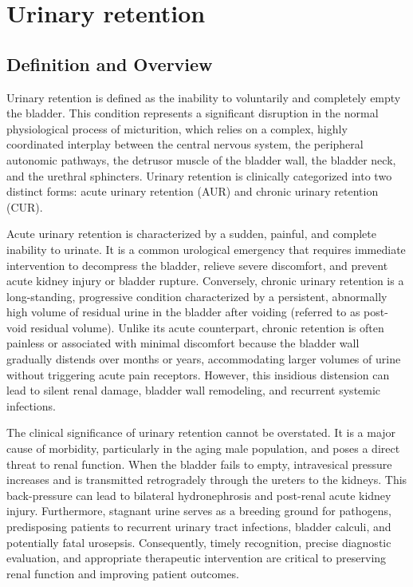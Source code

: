 \chapter{Urinary retention}

\section*{Definition and Overview}
Urinary retention is defined as the inability to voluntarily and completely empty the bladder. This condition represents a significant disruption in the normal physiological process of micturition, which relies on a complex, highly coordinated interplay between the central nervous system, the peripheral autonomic pathways, the detrusor muscle of the bladder wall, the bladder neck, and the urethral sphincters. Urinary retention is clinically categorized into two distinct forms: acute urinary retention (AUR) and chronic urinary retention (CUR).

Acute urinary retention is characterized by a sudden, painful, and complete inability to urinate. It is a common urological emergency that requires immediate intervention to decompress the bladder, relieve severe discomfort, and prevent acute kidney injury or bladder rupture. Conversely, chronic urinary retention is a long-standing, progressive condition characterized by a persistent, abnormally high volume of residual urine in the bladder after voiding (referred to as post-void residual volume). Unlike its acute counterpart, chronic retention is often painless or associated with minimal discomfort because the bladder wall gradually distends over months or years, accommodating larger volumes of urine without triggering acute pain receptors. However, this insidious distension can lead to silent renal damage, bladder wall remodeling, and recurrent systemic infections.

The clinical significance of urinary retention cannot be overstated. It is a major cause of morbidity, particularly in the aging male population, and poses a direct threat to renal function. When the bladder fails to empty, intravesical pressure increases and is transmitted retrogradely through the ureters to the kidneys. This back-pressure can lead to bilateral hydronephrosis and post-renal acute kidney injury. Furthermore, stagnant urine serves as a breeding ground for pathogens, predisposing patients to recurrent urinary tract infections, bladder calculi, and potentially fatal urosepsis. Consequently, timely recognition, precise diagnostic evaluation, and appropriate therapeutic intervention are critical to preserving renal function and improving patient outcomes.

